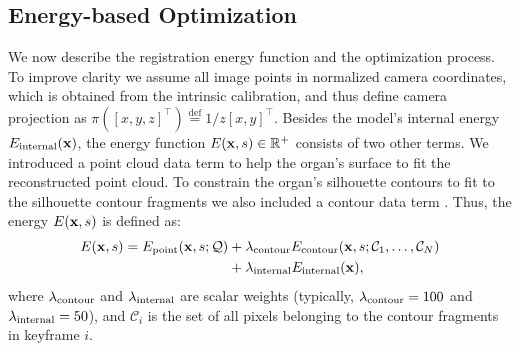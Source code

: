 \subsection{Energy-based Optimization}
\label{sec:enOpt}
We now describe the registration energy function and the optimization process. To improve clarity we assume all image points in normalized camera coordinates, which is obtained from the intrinsic calibration, and thus define camera projection as
$\pi(\left[x,y,z\right]^{\top})\overset{\mathrm{def}}{=}1/z \left[x,y\right]^{\top}$. 
Besides the model's internal energy $E_{\text{internal}}(\mathbf{x})$, the energy function $E(\mathbf{x},s)\in\mathbb{R}^+$ consists of two other terms.
We introduced a point cloud data term \Epoint to help the organ's surface to fit the reconstructed point cloud.
To constrain the organ's silhouette contours to fit to the silhouette contour fragments we also included a contour data term \Econtour. 
Thus, the energy $E(\mathbf{x},s)$ is defined as:
\begin{equation}
\label{eq:totalCost}
\begin{split}
E(\vet{x},s)=\Epoint(\vet{x},s;\mathcal{Q}) & + \lambdaContour\Econtour(\vet{x},s;\mathcal{C}_{1},\dots ,\mathcal{C}_{N})\\
& +\lambdaInternal\Einternal(\vet{x}),
\end{split}
\end{equation}
\noindent where $\lambda_{\text{contour}}$ and $\lambda_{\text{internal}}$ are scalar weights (typically, $\lambda_{\text{contour}}=100$ and $\lambda_{\text{internal}}=50$), and $\mathcal{C}_i$ is the set of all pixels belonging to the contour fragments in keyframe $i$.


